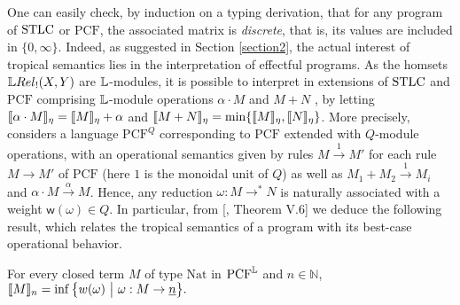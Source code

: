 One can easily check, by induction on a typing derivation, that for any program of $\mathrm{STLC}$ or $\mathrm{PCF}$, the associated matrix is \emph{discrete}, that is, its values are included in $\{0,\infty\}$. Indeed, as suggested in Section \ref{section2}, the actual interest of tropical semantics lies in the interpretation of effectful programs. 
%
As the homsets $\LREL_{!}(X,Y)$ are $\mathbb{L}$-modules, it is possible to interpret in extensions of $\mathrm{STLC}$ and $\mathrm{PCF}$ comprising $\mathbb{L}$-module operations $\alpha \cdot M$ and $M+N$ \cite{Manzo2013}, by 
letting $\llbracket\alpha\cdot M\rrbracket_{\eta}=\llbracket M\rrbracket_{\eta}+\alpha$ and 
$\llbracket M+N\rrbracket_{\eta}=\min\{\llbracket M\rrbracket_{\eta},\llbracket N\rrbracket_{\eta}\}$. 
More precisely, \cite{Manzo2013} considers a language $\mathrm{PCF}^{Q}$ corresponding to $\mathrm{PCF}$ extended with $Q$-module operations, with an operational semantics given by rules $M\stackrel{1}{\to}M'$ for each rule $M\to M'$ of $\mathrm{PCF}$ (here $1$ is the monoidal unit of $Q$) as well as 
$M_{1}+M_{2} \stackrel{1}{\to}M_{i}$ and $\alpha\cdot M \stackrel{\alpha}{\to} M $.
Hence, any reduction $\omega: M\to^{*} N$ is naturally associated with a weight $\mathsf w(\omega)\in Q$.
In particular, from [\cite{Manzo2013}, Theorem V.6] we deduce the following result, which relates the tropical semantics of a program with its best-case operational behavior.  
\begin{proposition}
For every closed term $M$ of type $\mathrm{Nat}$ in $\mathrm{PCF}^{\mathbb{L}}$ and $n\in \mathbb N$, $\model{M}_{n}=  \inf\big\{ \mathsf w(\omega) \ \big \vert \ \omega : M \to \underline n\big \}.$
\end{proposition}

